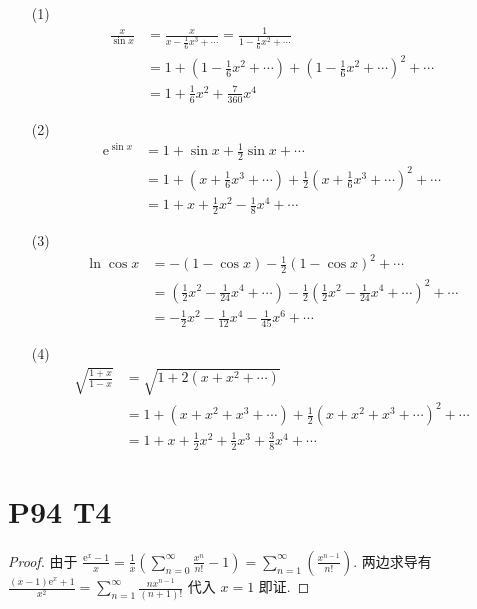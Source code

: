 \documentclass{article}
\newcommand{\nti}{\sum_{n = 1}^{\infty}}
\begin{document}
\begin{itemize}
    \item [(1)] \begin{align*}
        \frac{x}{\sin x} &= \frac{x}{x - \frac{1}{6}x^3 + \cdots} = \frac{1}{1 - \frac{1}{6}x^2 + \cdots} \\
        &= 1 + \left(1 - \frac{1}{6}x^2 + \cdots\right) + \left(1 - \frac{1}{6}x^2 + \cdots\right)^2 + \cdots \\
        &= 1 + \frac{1}{6}x^2 + \frac{7}{360}x^4
    \end{align*}
    \item [(2)] \begin{align*}
        \mathrm{e}^{\sin x} &= 1 + \sin x + \frac{1}{2}\sin x + \cdots \\
        &= 1 + \left(x + \frac{1}{6}x^3 + \cdots\right) + \frac{1}{2}\left(x + \frac{1}{6}x^3 + \cdots\right)^2 + \cdots \\
        &= 1 + x + \frac{1}{2}x^2 - \frac{1}{8}x^4 + \cdots
    \end{align*}
    \item [(3)] \begin{align}
        \ln \cos x &= -(1 - \cos x) - \frac{1}{2}(1 - \cos x)^2 + \cdots \\
        &= \left(\frac{1}{2}x^2 - \frac{1}{24}x^4 + \cdots\right) - \frac{1}{2}\left(\frac{1}{2}x^2 - \frac{1}{24}x^4 + \cdots\right)^2 + \cdots \\
        &= -\frac{1}{2}x^2 - \frac{1}{12}x^4 - \frac{1}{45}x^6 + \cdots
    \end{align}
    \item [(4)] \begin{align}
        \sqrt{\frac{1 + x}{1 - x}} &= \sqrt{1 + 2(x + x^2 + \cdots)} \\
        &= 1 + (x + x^2 + x^3 + \cdots) + \frac{1}{2}(x + x^2 + x^3 + \cdots)^2 + \cdots \\
        &= 1 + x + \frac{1}{2}x^2 + \frac{1}{2}x^3 + \frac{3}{8}x^4 + \cdots
    \end{align}
\end{itemize}

\section*{P94 T4}

\begin{proof}
    由于 $\frac{\mathrm{e}^x - 1}{x} = \frac{1}{x}\left(\sum_{n = 0}^{\infty}\frac{x^n}{n!} - 1\right) = \nti \left(\frac{x^{n - 1}}{n!}\right)$. 两边求导有 $\frac{(x - 1)\mathrm{e}^x + 1}{x^2} = \nti \frac{nx^{n - 1}}{(n + 1)!}$ 代入 $x = 1$ 即证.
\end{proof}
\end{document}
